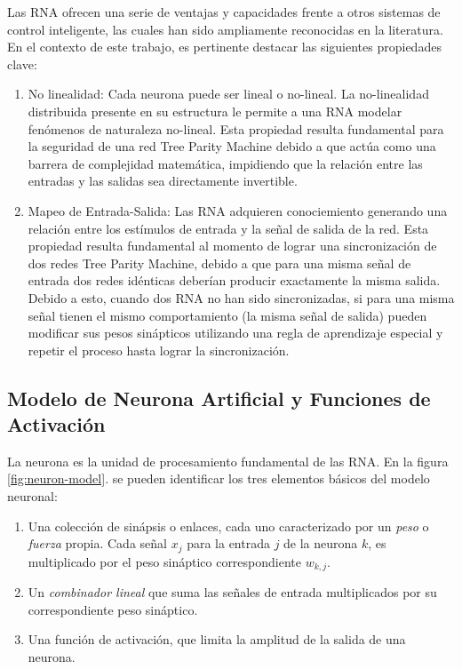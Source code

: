 Las RNA ofrecen una serie de ventajas y capacidades frente a otros sistemas de control inteligente, las cuales han sido ampliamente reconocidas en la literatura. En el contexto de este trabajo, es pertinente destacar las siguientes propiedades clave:
\begin{enumerate}
    \item No linealidad: Cada neurona puede ser lineal o no-lineal. La no-linealidad distribuida presente en su estructura le permite a una RNA modelar fenómenos de naturaleza no-lineal. Esta propiedad resulta fundamental para la seguridad de una red Tree Parity Machine debido a que actúa como una barrera de complejidad matemática, impidiendo que la relación entre las entradas y las salidas sea directamente invertible.
    \item Mapeo de Entrada-Salida: Las RNA adquieren conociemiento generando una relación entre los estímulos de entrada y la señal de salida de la red. Esta propiedad resulta fundamental al momento de lograr una sincronización de dos redes Tree Parity Machine, debido a que para una misma señal de entrada dos redes idénticas deberían producir exactamente la misma salida. Debido a esto, cuando dos RNA no han sido sincronizadas, si para una misma señal tienen el mismo comportamiento (la misma señal de salida) pueden modificar sus pesos sinápticos utilizando una regla de aprendizaje especial y repetir el proceso hasta lograr la sincronización.
\end{enumerate}

\subsection{Modelo de Neurona Artificial y Funciones de Activación}
La neurona es la unidad de procesamiento fundamental de las RNA. En la figura \ref{fig:neuron-model}. se pueden identificar los tres elementos básicos del modelo neuronal: 
\begin{enumerate}
    \item Una colección de sinápsis o enlaces, cada uno caracterizado por un \textit{peso} o \textit{fuerza} propia. Cada señal $x_j$ para la entrada $j$ de la neurona $k$, es multiplicado por el peso sináptico correspondiente $w_{k,j}$.
    \item Un \textit{combinador lineal} que suma las señales de entrada multiplicados por su correspondiente peso sináptico.
    \item Una función de activación, que limita la amplitud de la salida de una neurona.
\end{enumerate}


